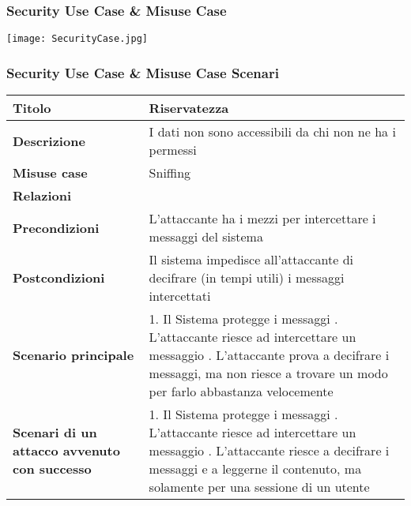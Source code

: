 \newpage
\subsubsection{Security Use Case \& Misuse Case}
\par
\texttt{[image: SecurityCase.jpg]}
\newpage


\subsubsection{Security Use Case \& Misuse Case Scenari}
\hfill

\begin{tabular} {|P{4cm}|P{13cm}|}
\hline
  \textbf{Titolo} & Riservatezza\\
\hline
  \textbf{Descrizione} & I dati non sono accessibili da chi non ne ha i permessi\\
\hline
  \textbf{Misuse case} & Sniffing\\
\hline
  \textbf{Relazioni} &\\
\hline
  \textbf{Precondizioni} & L'attaccante ha i mezzi per intercettare i messaggi del sistema\\
\hline
  \textbf{Postcondizioni} & Il sistema impedisce all'attaccante di decifrare (in tempi utili) i messaggi intercettati\\
\hline
  \textbf{Scenario principale} & 1. Il Sistema protegge i messaggi . L'attaccante riesce ad intercettare un messaggio . L'attaccante prova a decifrare i messaggi, ma non riesce a trovare un modo per farlo abbastanza velocemente\\
\hline
  \textbf{Scenari di un attacco avvenuto con successo} & 1. Il Sistema protegge i messaggi . L'attaccante riesce ad intercettare un messaggio . L'attaccante riesce a decifrare i messaggi e a leggerne il contenuto, ma solamente per una sessione di un utente\\
\hline
\end{tabular}

\hfill
\break

